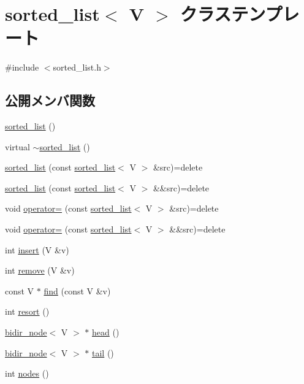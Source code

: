 \hypertarget{classsorted__list}{}\section{sorted\+\_\+list$<$ V $>$ クラステンプレート}
\label{classsorted__list}


{\ttfamily \#include $<$sorted\+\_\+list.\+h$>$}

\subsection*{公開メンバ関数}
\begin{DoxyCompactItemize}
\item 
\hyperlink{classsorted__list_a615f6cbdcb90d6da6894c47e4ae02dfe}{sorted\+\_\+list} ()
\item 
virtual \hyperlink{classsorted__list_a8e3259e7d55bcbccffad17f9e5c7a241}{$\sim$sorted\+\_\+list} ()
\item 
\hyperlink{classsorted__list_a93a0122771586ec16c2d4015bba1a1e1}{sorted\+\_\+list} (const \hyperlink{classsorted__list}{sorted\+\_\+list}$<$ V $>$ \&src)=delete
\item 
\hyperlink{classsorted__list_a2a822145165024c18095c4305db1c8f6}{sorted\+\_\+list} (const \hyperlink{classsorted__list}{sorted\+\_\+list}$<$ V $>$ \&\&src)=delete
\item 
void \hyperlink{classsorted__list_a1cd2f040fc38f16be7dc5f92139f61d4}{operator=} (const \hyperlink{classsorted__list}{sorted\+\_\+list}$<$ V $>$ \&src)=delete
\item 
void \hyperlink{classsorted__list_a813a43cf983820ca859a959ab739da16}{operator=} (const \hyperlink{classsorted__list}{sorted\+\_\+list}$<$ V $>$ \&\&src)=delete
\item 
int \hyperlink{classsorted__list_a7a88d284cebe5f221de7bc45165e02e0}{insert} (V \&v)
\item 
int \hyperlink{classsorted__list_adeade10cead68bad83d1eae1a9c841aa}{remove} (V \&v)
\item 
const V $\ast$ \hyperlink{classsorted__list_a013a3060fad4b6f11507ad2d66fea59b}{find} (const V \&v)
\item 
int \hyperlink{classsorted__list_a24c602fa9554ff65d4912d00ced7805b}{resort} ()
\item 
\hyperlink{classbidir__node}{bidir\+\_\+node}$<$ V $>$ $\ast$ \hyperlink{classsorted__list_a31980ee808541eebcf39ac0a1e0a5773}{head} ()
\item 
\hyperlink{classbidir__node}{bidir\+\_\+node}$<$ V $>$ $\ast$ \hyperlink{classsorted__list_ac89adea8f09aa4ee809e06f90c55b2b8}{tail} ()
\item 
int \hyperlink{classsorted__list_a87bcb37ce7df9c4477eb1509601a8fea}{nodes} ()
\end{DoxyCompactItemize}
